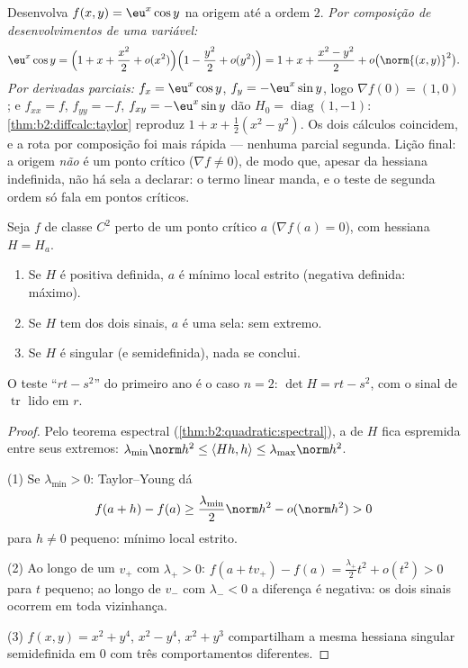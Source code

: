 \begin{example}\label{ex:b2:diffcalc:taylortwoways}
Desenvolva $f(x, y) = \eu^x\cos y$ na origem até a ordem $2$.
\emph{Por composição de desenvolvimentos de uma variável:}
\[
\eu^x\cos y = \Bigl(1 + x + \frac{x^2}{2} +
o(x^2)\Bigr)\Bigl(1 - \frac{y^2}{2} + o(y^2)\Bigr)
= 1 + x + \frac{x^2 - y^2}{2} + o\bigl(\norm{(x,y)}^2\bigr) .
\]
\emph{Por derivadas parciais:} $f_x = \eu^x\cos y$, $f_y =
-\eu^x\sin y$, logo $\nabla f(0) = (1, 0)$; e $f_{xx} = f$,
$f_{yy} = -f$, $f_{xy} = -\eu^x\sin y$ dão $H_0 =
\operatorname{diag}(1, -1)$: \cref{thm:b2:diffcalc:taylor}
reproduz $1 + x + \frac12(x^2 - y^2)$. Os dois cálculos
coincidem, e a rota por composição foi mais rápida --- nenhuma parcial
segunda. Lição final: a origem \emph{não} é um
ponto crítico ($\nabla f \neq 0$), de modo que, apesar da
hessiana indefinida, não há sela a declarar: o termo linear manda,
e o teste de segunda ordem só fala em pontos
críticos.
\end{example}

\begin{theorem}\label{thm:b2:diffcalc:extrema}
Seja $f$ de classe $C^2$ perto de um ponto crítico $a$ ($\nabla f(a) = 0$),
com hessiana $H = H_a$.
\begin{enumerate}
  \item Se $H$ é positiva definida, $a$ é mínimo local estrito
        (negativa definida: máximo).
  \item Se $H$ tem  dos dois sinais, $a$ é uma sela: sem
        extremo.
  \item Se $H$ é singular (e semidefinida), nada se conclui.
\end{enumerate}
O teste ``$rt - s^2$'' do primeiro ano é o caso $n = 2$: $\det H = rt -
s^2$, com o sinal de $\operatorname{tr}$ lido em $r$.
\end{theorem}

\begin{proof}
Pelo teorema espectral (\cref{thm:b2:quadratic:spectral}), a 
de $H$ fica espremida entre seus  extremos:
$\lambda_{\min}\norm h^2 \leq \langle Hh, h\rangle \leq
\lambda_{\max}\norm h^2$.

(1) Se $\lambda_{\min} > 0$: Taylor--Young dá
\[
f(a + h) - f(a) \geq \frac{\lambda_{\min}}{2}\norm h^2 -
o(\norm h^2) > 0
\]
para $h \neq 0$ pequeno: mínimo local estrito.

(2) Ao longo de um  $v_+$ com $\lambda_+ > 0$: $f(a + tv_+) -
f(a) = \frac{\lambda_+}{2}t^2 + o(t^2) > 0$ para $t$ pequeno; ao longo de
$v_-$ com $\lambda_- < 0$ a diferença é negativa: os dois sinais
ocorrem em toda vizinhança.

(3) $f(x,y) = x^2 + y^4$, $x^2 - y^4$, $x^2 + y^3$ compartilham a mesma
hessiana singular semidefinida em $0$ com três comportamentos
diferentes.
\end{proof}

